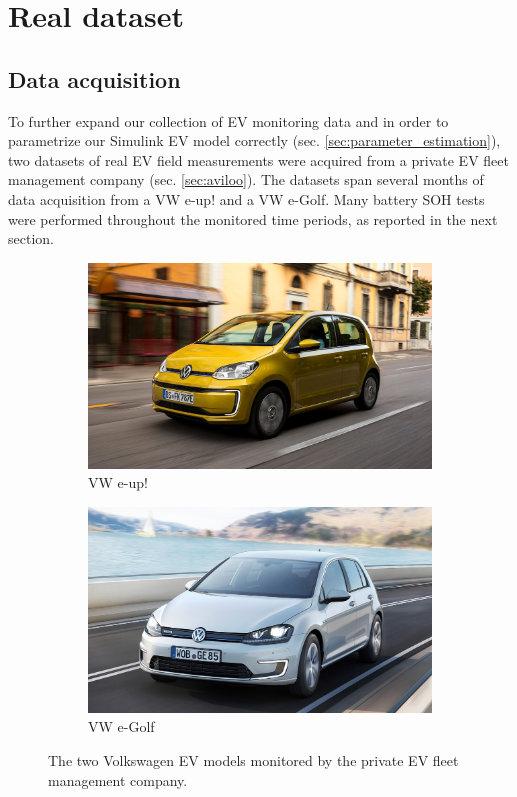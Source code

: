\chapter{Real dataset}
\label{sec:aviloo_ds}

\section{Data acquisition}
\label{sec:aviloo_ds_intro}
To further expand our collection of EV monitoring data and in order to parametrize our Simulink EV model correctly (sec. \ref{sec:parameter_estimation}), two datasets of real EV field measurements were acquired from a private EV fleet management company (sec. \ref{sec:aviloo}). The datasets span several months of data acquisition from a VW e-up! and a VW e-Golf. Many battery SOH tests were performed throughout the monitored time periods, as reported in the next section.

\begin{figure}[htb!]
\centering
\begin{subfigure}[t]{0.475\textwidth}
    \centering
    \includegraphics[width=\textwidth]{images/eup}
    \caption{VW e-up!}
\end{subfigure}
\hfill
\begin{subfigure}[t]{0.475\textwidth}
    \centering
    \includegraphics[width=\textwidth]{images/egolf}
    \caption{VW e-Golf}
\end{subfigure}
\caption[VW e-up! and VW e-Golf]{The two Volkswagen EV models monitored by the private EV fleet management company.}
\label{fig:eup_egolf}
\end{figure}



